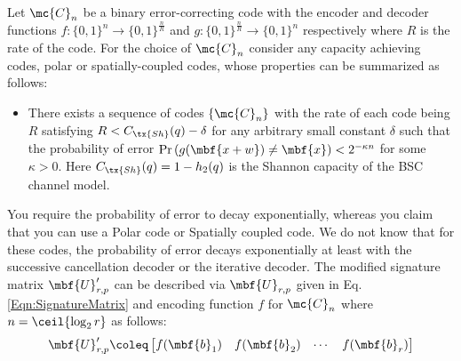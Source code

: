 \documentclass[conference,twocolumn]{IEEEtran}
\begin{document}
{Let $\mc{C}_n$ be a binary error-correcting code with the encoder and decoder functions $f:\{0,1\}^{n}\rightarrow \{0,1\}^{\frac{n}{R}}$ and $g:\{0,1\}^{\frac{n}{R}}\rightarrow \{0,1\}^{n}$ respectively where $R$ is the rate of the code.
For the choice of $\mc{C}_n$ consider any capacity achieving codes, polar or spatially-coupled codes, whose properties can be summarized as follows:
\begin{itemize}
\item There exists a sequence of codes $\{\mc{C}_n\}$ with the rate of each code being $R$ satisfying $R< C_{\tx{Sh}}(q)-\delta$ for any arbitrary small constant $\delta$ such that the probability of error $\text{Pr}\left(g(\mbf{x+w})\neq \mbf{x}\right)<2^{-\kappa n}$ for some $\kappa >0$. Here $C_{\tx{Sh}}(q)=1-h_2(q)$ is the Shannon capacity of the BSC channel model.
\end{itemize}
\textcolor[rgb]{1.00,0.00,0.00}{You require the probability of error to decay exponentially, whereas you claim that you can use a Polar code or Spatially coupled code. We do not know that for these codes, the probability of error decays exponentially at least with the successive cancellation decoder or the iterative decoder.}
The modified signature matrix $\mbf{U}'_{r,p}$ can be described via $\mbf{U}_{r, p}$ given in Eq. \eqref{Eqn:SignatureMatrix} and encoding function $f$ for $\mc{C}_n$ where $n=\ceil{\log_2 r}$ as follows:
 \begin{align}
\label{Eqn:SignatureMatrixModified}
\mbf{U}_{r,p}'\coleq\begin{bmatrix}
f(\mbf{b}_1)  & f(\mbf{b}_2) &\cdots & f(\mbf{b}_r) \\

\end{bmatrix}
\end{align}}
\end{document}
